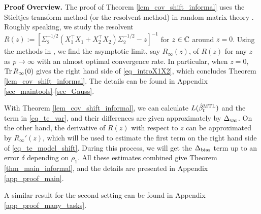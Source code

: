 \textbf{Proof Overview.} The proof of Theorem \ref{lem_cov_shift_informal} uses the Stieltjes transform method (or the resolvent method) in random matrix theory \cite{bai2009spectral,tao2012topics,erdos2017dynamical}. Roughly speaking, we study the resolvent $R(z):=[\Sigma_2^{-1/2}( X_1^{\top}X_1 + X_2^{\top}X_2)\Sigma_2^{-1/2}-z]^{-1}$ for $z\in \mathbb{C}$ around $z=0$. Using the methods in \cite{Anisotropic,yang2019spiked}, we find the asymptotic limit, say $R_\infty(z)$, of $R(z)$ for any $z$ as $p\to \infty$ with an almost optimal convergence rate. In particular, when $z=0$, $\operatorname{Tr} R_\infty(0)$ gives the right hand side of \eqref{eq_introX1X2}, which concludes Theorem \ref{lem_cov_shift_informal}. The details can be found in Appendix \ref{sec_maintools}-\ref{sec_Gauss}.

With  Theorem \ref{lem_cov_shift_informal}, we can calculate $L(\hat{\beta}_t^{\text{MTL}})$ and the term in \eqref{eq_te_var}, and their differences are given approximately by $\Delta_{\text{var}}$. On the other hand, the derivative of $R(z)$ with respect to $z$ can be approximated by $R_\infty'(z)$, which will be used to estimate the first term on the right hand side of \eqref{eq_te_model_shift}. During this process, we will get the $\Delta_{\text{bias}}$ term up to an error $\delta$ depending on $\rho_1$. All these estimates combined give Theorem \ref{thm_main_informal}, and the details are presented in Appendix \ref{app_proof_main}.

A similar result for the second setting can be found in Appendix \ref{app_proof_many_tasks}.


